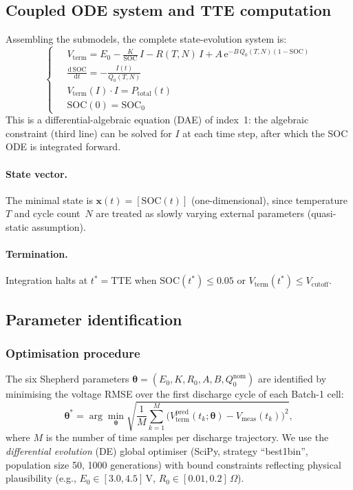\documentclass[5p,times,number]{elsarticle}
\begin{document}
\subsection{Coupled ODE system and TTE computation}\label{sec:ode}
Assembling the submodels, the complete state-evolution system is:
\begin{equation}\label{eq:system}
\left\{\;
\begin{aligned}
& V_{\mathrm{term}} = E_0 - \frac{K}{\mathrm{SOC}}\,I - R(T,N)\,I + A\,\mathrm{e}^{-B\,Q_0(T,N)(1-\mathrm{SOC})}\\[6pt]
& \frac{\mathrm{d}\,\mathrm{SOC}}{\mathrm{d}t} = -\frac{I(t)}{Q_0(T,N)}\\[6pt]
& V_{\mathrm{term}}(I) \cdot I = P_{\mathrm{total}}(t)\\[4pt]
& \mathrm{SOC}(0) = \mathrm{SOC}_0
\end{aligned}
\right.
\end{equation}
This is a differential-algebraic equation (DAE) of index~1: the algebraic constraint (third line) can be solved for $I$ at each time step, after which the SOC ODE is integrated forward.
\paragraph{State vector.}
The minimal state is $\mathbf{x}(t) = [\mathrm{SOC}(t)]$ (one-dimensional), since temperature~$T$ and cycle count~$N$ are treated as slowly varying external parameters (quasi-static assumption).
\paragraph{Termination.}
Integration halts at $t^* = \mathrm{TTE}$ when $\mathrm{SOC}(t^*) \le 0.05$ or $V_{\mathrm{term}}(t^*) \le V_{\mathrm{cutoff}}$.

\subsection{Parameter identification}\label{sec:paramfit}
\subsubsection{Optimisation procedure}
The six Shepherd parameters $\boldsymbol{\theta} = (E_0, K, R_0, A, B, Q_0^{\mathrm{nom}})$ are identified by minimising the voltage RMSE over the first discharge cycle of each Batch-1 cell:
\begin{equation}\label{eq:obj}
\boldsymbol{\theta}^* = \arg\min_{\boldsymbol{\theta}} \sqrt{\frac{1}{M}\sum_{k=1}^{M}\bigl(V_{\mathrm{term}}^{\mathrm{pred}}(t_k;\boldsymbol{\theta}) - V_{\mathrm{meas}}(t_k)\bigr)^2},
\end{equation}
where $M$ is the number of time samples per discharge trajectory.
We use the \emph{differential evolution} (DE) global optimiser (SciPy, strategy ``best1bin'', population size 50, 1000 generations) with bound constraints reflecting physical plausibility (e.g., $E_0 \in [3.0, 4.5]$\,V, $R_0 \in [0.01, 0.2]$\,$\Omega$).
\end{document}

